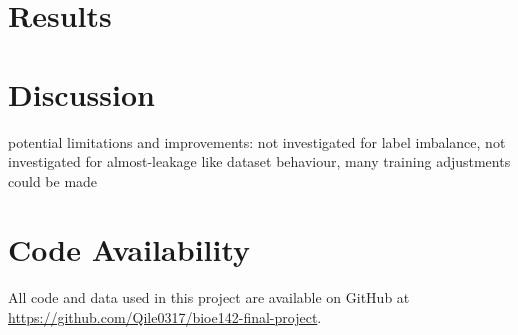 \section{Results}


\section{Discussion}
\lipsum[5]

potential limitations and improvements: not investigated for label imbalance, not investigated for almost-leakage like dataset behaviour, many training adjustments could be made

\section{Code Availability}

All code and data used in this project are available on GitHub at \url{https://github.com/Qile0317/bioe142-final-project}.

\printbibliography[heading=bibnumbered]
